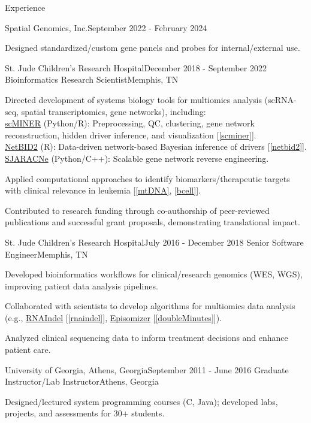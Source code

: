 \documentclass{resume} %
\begin{document}
\begin{rSection}{Experience}
\begin{rSubsection}{Spatial Genomics, Inc.}{September 2022 - February 2024}
\item Designed standardized/custom gene panels and probes for internal/external use.
\end{rSubsection}


\begin{rSubsection}{St. Jude Children's Research Hospital}{December 2018 - September 2022}
{Bioinformatics Research Scientist}{Memphis, TN}
\item Directed development of systems biology tools for multiomics analysis (scRNA-seq, spatial transcriptomics, gene networks), including:\\
\href{https://jyyulab.github.io/scMINER/}{scMINER} (Python/R): Preprocessing, QC, clustering, gene network reconstruction, hidden driver inference, and visualization [\ref{scminer}].\\
\href{https://jyyulab.github.io/NetBID/}{NetBID2} (R): Data-driven network-based Bayesian inference of drivers [\ref{netbid2}].\\
\href{https://github.com/jyyulab/SJARACNe}{SJARACNe} (Python/C++): Scalable gene network reverse engineering.

\item Applied computational approaches to identify biomarkers/therapeutic targets with clinical relevance in leukemia [\ref{mtDNA}, \ref{bcell}].

\item Contributed to research funding through co-authorship of peer-reviewed publications and successful grant proposals, demonstrating translational impact.
\end{rSubsection}


\begin{rSubsection}{St. Jude Children's Research Hospital}{July 2016 - December 2018}
{Senior Software Engineer}{Memphis, TN}
\item Developed bioinformatics workflows for clinical/research genomics (WES, WGS), improving patient data analysis pipelines.

\item Collaborated with scientists to develop algorithms for multiomics data analysis (e.g., \href{https://github.com/stjude/RNAIndel}{RNAIndel} [\ref{rnaindel}], \href{https://github.com/stjude/Episomizer}{Episomizer} [\ref{doubleMinutes}]).

\item Analyzed clinical sequencing data to inform treatment decisions and enhance patient care.
\end{rSubsection}


\begin{rSubsection}{University of Georgia, Athens, Georgia}{September 2011 - June 2016}
{Graduate Instructor/Lab Instructor}{Athens, Georgia}
\item Designed/lectured system programming courses (C, Java); developed labs, projects, and assessments for 30+ students.
\end{rSubsection}

\end{rSection}
\end{document}
